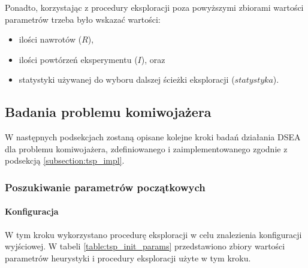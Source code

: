 \documentclass[./FM_mgr.tex]{subfiles}
\begin{document}
	Ponadto, korzystając z procedury eksploracji poza powyższymi zbiorami wartości parametrów trzeba było wskazać wartości:
	
	\begin{itemize}
		\item ilości nawrotów ($R$),
		\item ilości powtórzeń eksperymentu ($I$), oraz
		\item statystyki używanej do wyboru dalszej ścieżki eksploracji ($statystyka$).
	\end{itemize}
	
	\subsection{Badania problemu komiwojażera}
	
	W następnych podsekcjach zostaną opisane kolejne kroki badań działania DSEA dla problemu komiwojażera, zdefiniowanego i zaimplementowanego zgodnie z podsekcją \ref{subsection:tsp_impl}.
	
	\subsubsection{Poszukiwanie parametrów początkowych}
	
	\paragraph{Konfiguracja}
	
	W tym kroku wykorzystano procedurę eksploracji w celu znalezienia konfiguracji wyjściowej. W tabeli \ref{table:tsp_init_params} przedstawiono zbiory wartości parametrów heurystyki i procedury eksploracji użyte w tym kroku.
	
\end{document}
